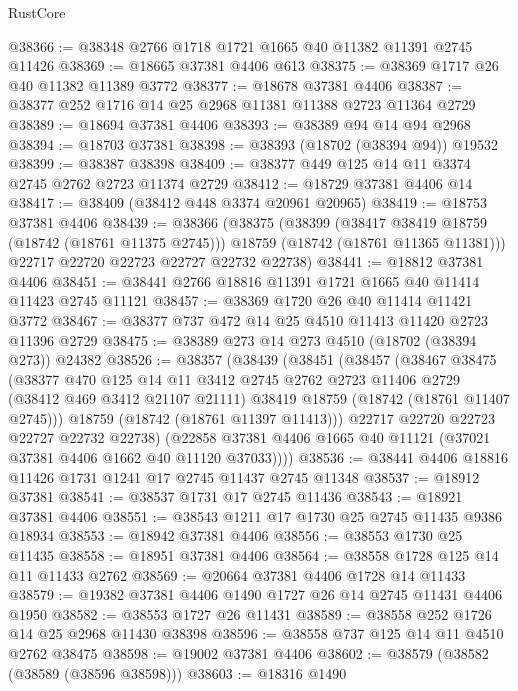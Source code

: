 \begin{lexlean}{RustCore}
\begin{coremodule}
@38366 := @38348 @2766 @1718 @1721 @1665 @40 @11382 @11391 @2745 @11426
@38369 := @18665 @37381 @4406 @613
@38375 := @38369 @1717 @26 @40 @11382 @11389 @3772
@38377 := @18678 @37381 @4406
@38387 := @38377 @252 @1716 @14 @25 @2968 @11381 @11388 @2723 @11364 @2729
@38389 := @18694 @37381 @4406
@38393 := @38389 @94 @14 @94 @2968
@38394 := @18703 @37381
@38398 := @38393 (@18702 (@38394 @94)) @19532
@38399 := @38387 @38398
@38409 := @38377 @449 @125 @14 @11 @3374 @2745 @2762 @2723 @11374 @2729
@38412 := @18729 @37381 @4406 @14
@38417 := @38409 (@38412 @448 @3374 @20961 @20965)
@38419 := @18753 @37381 @4406
@38439 := @38366
    (@38375
      (@38399
        (@38417 @38419 @18759 (@18742 (@18761 @11375 @2745)))
        @18759
        (@18742 (@18761 @11365 @11381)))
      @22717
      @22720
      @22723
      @22727
      @22732
      @22738)
@38441 := @18812 @37381 @4406
@38451 := @38441 @2766 @18816 @11391 @1721 @1665 @40 @11414 @11423 @2745 @11121
@38457 := @38369 @1720 @26 @40 @11414 @11421 @3772
@38467 := @38377 @737 @472 @14 @25 @4510 @11413 @11420 @2723 @11396 @2729
@38475 := @38389 @273 @14 @273 @4510 (@18702 (@38394 @273)) @24382
@38526 := @38357
    (@38439
      (@38451
        (@38457
          (@38467
            @38475
            (@38377
              @470
              @125
              @14
              @11
              @3412
              @2745
              @2762
              @2723
              @11406
              @2729
              (@38412 @469 @3412 @21107 @21111)
              @38419
              @18759
              (@18742 (@18761 @11407 @2745)))
            @18759
            (@18742 (@18761 @11397 @11413)))
          @22717
          @22720
          @22723
          @22727
          @22732
          @22738)
        (@22858 @37381 @4406 @1665 @40 @11121 (@37021 @37381 @4406 @1662 @40 @11120 @37033))))
@38536 := @38441 @4406 @18816 @11426 @1731 @1241 @17 @2745 @11437 @2745 @11348
@38537 := @18912 @37381
@38541 := @38537 @1731 @17 @2745 @11436
@38543 := @18921 @37381 @4406
@38551 := @38543 @1211 @17 @1730 @25 @2745 @11435 @9386 @18934
@38553 := @18942 @37381 @4406
@38556 := @38553 @1730 @25 @11435
@38558 := @18951 @37381 @4406
@38564 := @38558 @1728 @125 @14 @11 @11433 @2762
@38569 := @20664 @37381 @4406 @1728 @14 @11433
@38579 := @19382 @37381 @4406 @1490 @1727 @26 @14 @2745 @11431 @4406 @1950
@38582 := @38553 @1727 @26 @11431
@38589 := @38558 @252 @1726 @14 @25 @2968 @11430 @38398
@38596 := @38558 @737 @125 @14 @11 @4510 @2762 @38475
@38598 := @19002 @37381 @4406
@38602 := @38579 (@38582 (@38589 (@38596 @38598)))
@38603 := @18316 @1490

\end{coremodule}
\end{lexlean}
